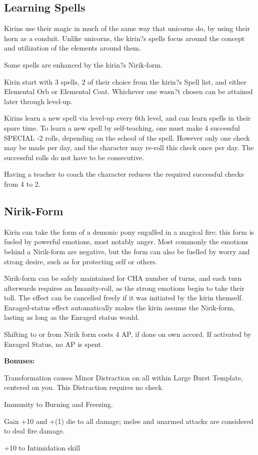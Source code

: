 \documentclass[11pt,a4paper,twocolumn]{book}
\begin{document}
	\subsection*{Learning Spells}
	
	Kirins use their magic in much of the same way that unicorns do, by using their horn as a conduit. Unlike unicorns, the kirin?s spells focus around the concept and utilization of the elements around them.
	
	Some spells are enhanced by the kirin?s Nirik-form.
	
	Kirin start with 3 spells, 2 of their choice from the kirin?s Spell list, and either Elemental Orb or Elemental Coat. Whichever one wasn?t chosen can be attained later through level-up.
	
	Kirins learn a new spell via level-up every 6th level, and can learn spells in their spare time. To learn a new spell by self-teaching, one must make 4 successful SPECIAL -2 rolls, depending on the school of the spell. However only one check may be made per day, and the character may re-roll this check once per day. The successful rolls do not have to be consecutive.
	
	Having a teacher to coach the character reduces the required successful checks from 4 to 2.
	
	\subsection*{Nirik-Form}
	
	Kirin can take the form of a demonic pony engulfed in a magical fire; this form is fueled by powerful emotions, most notably anger. Most commonly the emotions behind a Nirik-form are negative, but the form can also be fuelled by worry and strong desire, such as for protecting self or others.
	
	Nirik-form can be safely maintained for CHA number of turns, and each turn afterwards requires an Insanity-roll, as the strong emotions begin to take their toll. The effect can be cancelled freely if it was initiated by the kirin themself. Enraged-status effect automatically makes the kirin assume the Nirik-form, lasting as long as the Enraged status would.
	
	Shifting to or from Nirik form costs 4 AP, if done on own accord. If activated by Enraged Status, no AP is spent.
	
	\textbf{Bonuses:}
	\begin{compactitem}
		\item Transformation causes Minor Distraction on all within Large Burst Template, centered on you. This Distraction requires no check.
		\item Immunity to Burning and Freezing.
		\item Gain +10 and +(1) die to all damage; melee and unarmed attacks are considered to deal fire damage.
		\item +10 to Intimidation skill
	\end{compactitem}
	
\end{document}
